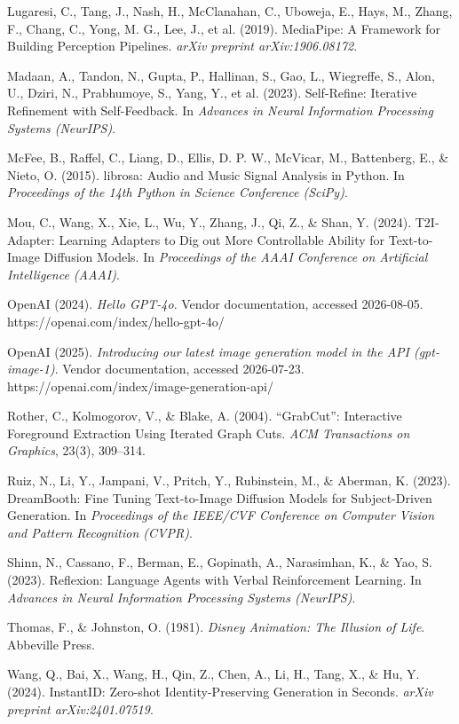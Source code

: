 \documentclass[10pt,twocolumn,letterpaper]{article}
\begin{document}
Lugaresi, C., Tang, J., Nash, H., McClanahan, C., Uboweja, E., Hays, M., Zhang, F., Chang, C., Yong, M. G., Lee, J., et al. (2019). MediaPipe: A Framework for Building Perception Pipelines. \emph{arXiv preprint arXiv:1906.08172}.

Madaan, A., Tandon, N., Gupta, P., Hallinan, S., Gao, L., Wiegreffe, S., Alon, U., Dziri, N., Prabhumoye, S., Yang, Y., et al. (2023). Self-Refine: Iterative Refinement with Self-Feedback. In \emph{Advances in Neural Information Processing Systems (NeurIPS)}.

McFee, B., Raffel, C., Liang, D., Ellis, D. P. W., McVicar, M., Battenberg, E., \& Nieto, O. (2015). librosa: Audio and Music Signal Analysis in Python. In \emph{Proceedings of the 14th Python in Science Conference (SciPy)}.

Mou, C., Wang, X., Xie, L., Wu, Y., Zhang, J., Qi, Z., \& Shan, Y. (2024). T2I-Adapter: Learning Adapters to Dig out More Controllable Ability for Text-to-Image Diffusion Models. In \emph{Proceedings of the AAAI Conference on Artificial Intelligence (AAAI)}.

OpenAI (2024). \emph{Hello GPT-4o}. Vendor documentation, accessed 2026-08-05. https://openai.com/index/hello-gpt-4o/

OpenAI (2025). \emph{Introducing our latest image generation model in the API (gpt-image-1)}. Vendor documentation, accessed 2026-07-23. https://openai.com/index/image-generation-api/

Rother, C., Kolmogorov, V., \& Blake, A. (2004). ``GrabCut'': Interactive Foreground Extraction Using Iterated Graph Cuts. \emph{ACM Transactions on Graphics}, 23(3), 309--314.

Ruiz, N., Li, Y., Jampani, V., Pritch, Y., Rubinstein, M., \& Aberman, K. (2023). DreamBooth: Fine Tuning Text-to-Image Diffusion Models for Subject-Driven Generation. In \emph{Proceedings of the IEEE/CVF Conference on Computer Vision and Pattern Recognition (CVPR)}.

Shinn, N., Cassano, F., Berman, E., Gopinath, A., Narasimhan, K., \& Yao, S. (2023). Reflexion: Language Agents with Verbal Reinforcement Learning. In \emph{Advances in Neural Information Processing Systems (NeurIPS)}.

Thomas, F., \& Johnston, O. (1981). \emph{Disney Animation: The Illusion of Life}. Abbeville Press.

Wang, Q., Bai, X., Wang, H., Qin, Z., Chen, A., Li, H., Tang, X., \& Hu, Y. (2024). InstantID: Zero-shot Identity-Preserving Generation in Seconds. \emph{arXiv preprint arXiv:2401.07519}.
\end{document}
